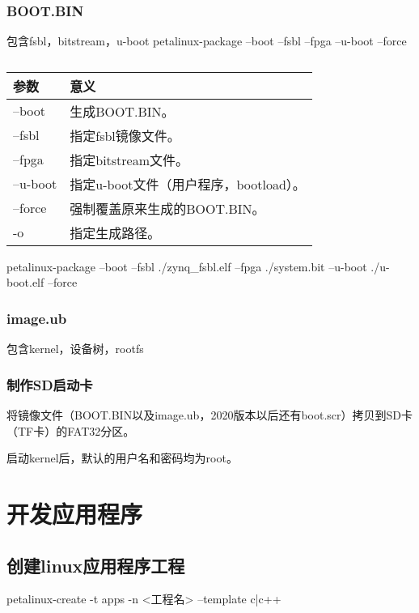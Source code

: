 \documentclass[12pt, a4paper, oneside]{ctexbook}
\newcounter{#2}
\newcounter{#2}[#1]
\numberwithin{#2}{#1}
\begin{document}
              \subsection{BOOT.BIN}
              包含fsbl，bitstream，u-boot
              petalinux-package --boot --fsbl --fpga --u-boot --force 
              \begin{table}[!ht]
                  \centering
                  \caption{}
                  \begin{tabular}{m{}<{\centering}|m{}<{\raggedright}}
                    \toprule[2pt]
                    {\bf 参数}&{\bf 意义}\\
                    \toprule[1pt]
                    --boot&生成BOOT.BIN。\\\midrule
                    --fsbl&指定fsbl镜像文件。\\\midrule
                    --fpga&指定bitstream文件。\\\midrule
                    --u-boot&指定u-boot文件（用户程序，bootload）。\\\midrule
                    --force&强制覆盖原来生成的BOOT.BIN。\\\midrule
                    -o&指定生成路径。\\\midrule
                    \bottomrule[2pt]
                  \end{tabular}
                \end{table}
                petalinux-package --boot --fsbl ./zynq\_fsbl.elf --fpga ./system.bit --u-boot ./u-boot.elf --force
              \subsection{image.ub}
              包含kernel，设备树，rootfs
              \subsection{制作SD启动卡}
              将镜像文件（BOOT.BIN以及image.ub，2020版本以后还有boot.scr）拷贝到SD卡（TF卡）的FAT32分区。

              启动kernel后，默认的用户名和密码均为root。

              

              \chapter{开发应用程序}
              \section{创建linux应用程序工程}
              petalinux-create -t apps -n <工程名> --template c|c++
\end{document}
